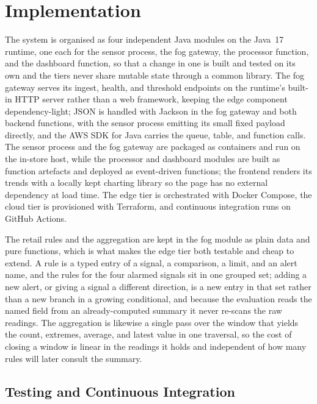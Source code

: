 \documentclass[conference]{IEEEtran}
\begin{document}
\section{Implementation}

The system is organised as four independent Java modules on the Java~17 runtime, one each for the sensor process, the fog gateway, the processor function, and the dashboard function, so that a change in one is built and tested on its own and the tiers never share mutable state through a common library. The fog gateway serves its ingest, health, and threshold endpoints on the runtime's built-in HTTP server rather than a web framework, keeping the edge component dependency-light; JSON is handled with Jackson in the fog gateway and both backend functions, with the sensor process emitting its small fixed payload directly, and the AWS SDK for Java carries the queue, table, and function calls. The sensor process and the fog gateway are packaged as containers and run on the in-store host, while the processor and dashboard modules are built as function artefacts and deployed as event-driven functions; the frontend renders its trends with a locally kept charting library so the page has no external dependency at load time. The edge tier is orchestrated with Docker Compose, the cloud tier is provisioned with Terraform, and continuous integration runs on GitHub Actions.

The retail rules and the aggregation are kept in the fog module as plain data and pure functions, which is what makes the edge tier both testable and cheap to extend. A rule is a typed entry of a signal, a comparison, a limit, and an alert name, and the rules for the four alarmed signals sit in one grouped set; adding a new alert, or giving a signal a different direction, is a new entry in that set rather than a new branch in a growing conditional, and because the evaluation reads the named field from an already-computed summary it never re-scans the raw readings. The aggregation is likewise a single pass over the window that yields the count, extremes, average, and latest value in one traversal, so the cost of closing a window is linear in the readings it holds and independent of how many rules will later consult the summary.

\subsection{Testing and Continuous Integration}
\end{document}
